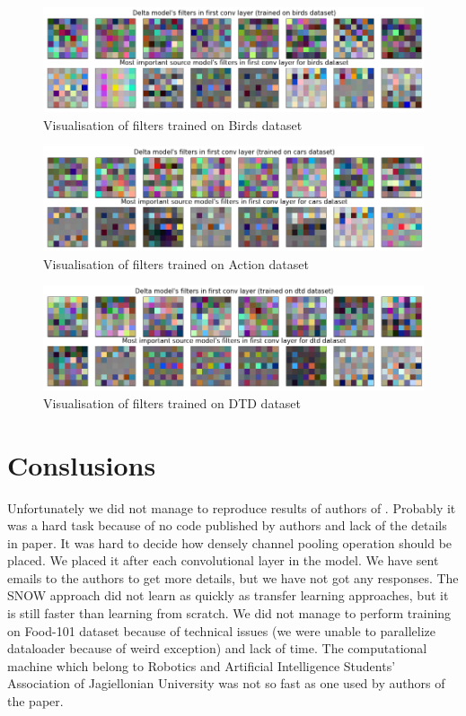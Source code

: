 \documentclass[12pt]{article}
\begin{document}
    \begin{figure}
        \centering
        \includegraphics[width=\linewidth]{birds}
        \caption{Visualisation of filters trained on Birds dataset}
        \label{fig:filters_birds}
    \end{figure}

    \begin{figure}
        \centering
        \includegraphics[width=\linewidth]{cars}
        \caption{Visualisation of filters trained on Action dataset}
        \label{fig:filters_cars}
    \end{figure}

    \begin{figure}
        \centering
        \includegraphics[width=\linewidth]{dtd}
        \caption{Visualisation of filters trained on DTD dataset}
        \label{fig:filters_dtd}
    \end{figure}

    \section{Conslusions}

    Unfortunately we did not manage to reproduce results of authors of \cite{paper}.
    Probably it was a hard task because of no code published by authors and lack of the details in paper.
    It was hard to decide how densely channel pooling operation should be placed.
    We placed it after each convolutional layer in the model.
    We have sent emails to the authors to get more details, but we have not got any responses.
    The SNOW approach did not learn as quickly as transfer learning approaches, but it is still faster than learning from scratch.
    We did not manage to perform training on Food-101 dataset because of technical issues (we were unable to parallelize dataloader because of weird exception) and lack of time.
    The computational machine which belong to Robotics and Artificial Intelligence Students' Association of Jagiellonian University was not so fast as one used by authors of the paper.
\end{document}
